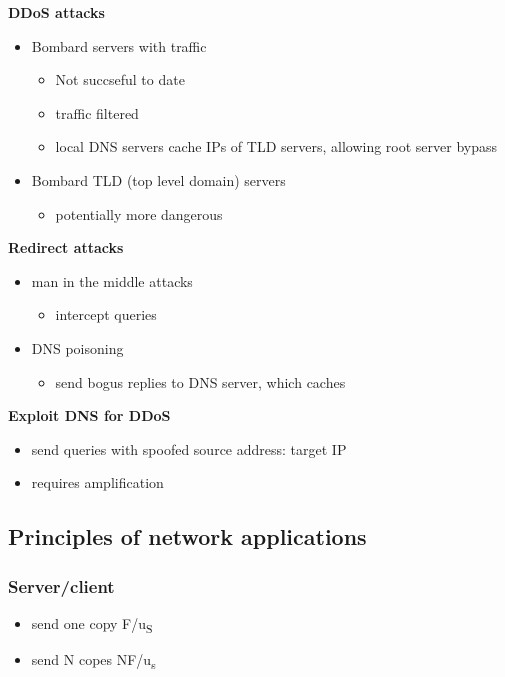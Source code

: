 \documentclass[11pt]{article}
\begin{document}
\textbf{DDoS attacks}
\begin{itemize}
\item Bombard servers with traffic
\begin{itemize}
\item Not succseful to date
\item traffic filtered
\item local DNS servers cache IPs of TLD servers, allowing root server
bypass
\end{itemize}
\item Bombard TLD (top level domain) servers
\begin{itemize}
\item potentially more dangerous
\end{itemize}
\end{itemize}

\textbf{Redirect attacks}
\begin{itemize}
\item man in the middle attacks
\begin{itemize}
\item intercept queries
\end{itemize}
\item DNS poisoning
\begin{itemize}
\item send bogus replies to DNS server, which caches
\end{itemize}
\end{itemize}

\textbf{Exploit DNS for DDoS}
\begin{itemize}
\item send queries with spoofed source address: target IP
\item requires amplification
\end{itemize}

\subsection{Principles of network applications}
\label{sec:org4a9c767}
\subsubsection{Server/client}
\label{sec:org7a96184}
\begin{itemize}
\item send one copy F/u\textsubscript{S}
\item send N copes NF/u\textsubscript{s}
\end{itemize}
\end{document}
